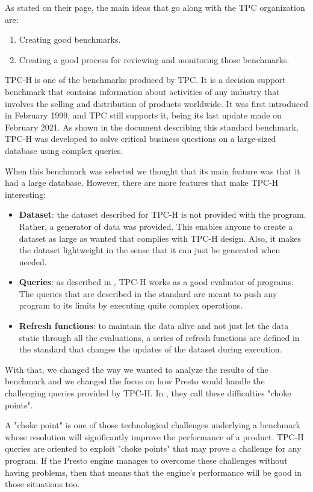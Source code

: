 \documentclass[conference]{IEEEtran}
\begin{document}
As stated on their page, the main ideas that go along with the TPC organization are:
\begin{enumerate}
    \item Creating good benchmarks.
    \item Creating a good process for reviewing and monitoring those benchmarks.
\end{enumerate}

TPC-H is one of the benchmarks produced by TPC. It is a decision support benchmark that contains information about activities of any industry that involves the selling and distribution of products worldwide. It was first introduced in February 1999, and TPC still supports it, being its last update made on February 2021. As shown in the document describing this standard benchmark, TPC-H was developed to solve critical business questions on a large-sized database using complex queries. \cite{transaction-processing-performance-council-2021}

When this benchmark was selected we thought that its main feature was that it had a large database. However, there are more features that make TPC-H interesting:

\begin{itemize}
    \item \textbf{Dataset}: the dataset described for TPC-H is not provided with the program. Rather, a generator of data was provided. This enables anyone to create a dataset as large as wanted that complies with TPC-H design. Also, it makes the dataset lightweight in the sense that it can just be generated when needed.
    \item \textbf{Queries}: as described in \cite{boncz-2014}, TPC-H works as a good evaluator of programs. The queries that are described in the standard are meant to push any program to its limits by executing quite complex operations.
    \item \textbf{Refresh functions}: to maintain the data alive and not just let the data static through all the evaluations, a series of refresh functions are defined in the standard that changes the updates of the dataset during execution.
\end{itemize}

With that, we changed the way we wanted to analyze the results of the benchmark and we changed the focus on how Presto would handle the challenging queries provided by TPC-H. In \cite{boncz-2014}, they call these difficulties "choke points".

A "choke point" is one of those technological challenges underlying a benchmark whose resolution will significantly improve the performance of a product.
TPC-H queries are oriented to exploit "choke points" that may prove a challenge for any program. If the Presto engine manages to overcome these challenges without having problems, then that means that the engine's performance will be good in those situations too.
\end{document}
